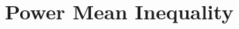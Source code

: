 \documentclass{subfile}
\begin{document}
	\section{Power Mean Inequality}\label{sec:powermean}
\end{document}
